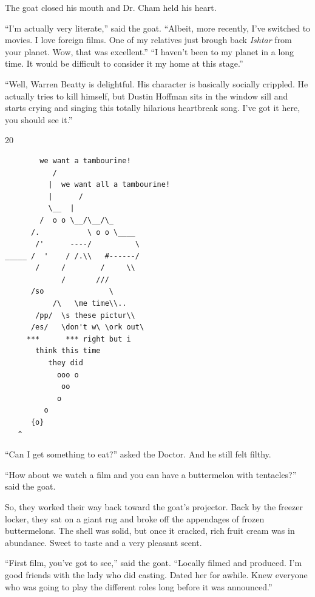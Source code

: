 \documentclass[10pt,twoside]{report}
\begin{document}
The goat closed his mouth and Dr. Cham held his heart.

``I'm actually very literate,'' said the goat.  ``Albeit, more
recently, I've switched to movies.  I love foreign films.  One of my
relatives just brough back {\em Ishtar} from your planet.  Wow, that
was excellent.''  ``I haven't been to my planet in a long time.  It
would be difficult to consider it my home at this stage.''

``Well, Warren Beatty is delightful.  His character is basically
socially crippled.  He actually tries to kill himself, but Dustin
Hoffman sits in the window sill and starts crying and singing this
totally hilarious heartbreak song.  I've got it here, you should see
it.''

	\begin{sidebar}{}{20}
\begin{verbatim}
		we want a tambourine!
           /
          |  we want all a tambourine!
          |      /
          \__  |
        /  o o \__/\__/\_
      /.           \ o o \____
       /'      ----/          \
_____ /  '    / /.\\   #------/
       /     /        /     \\
             /       ///
      /so               \
           /\   \me time\\..
       /pp/  \s these pictur\\
      /es/   \don't w\ \ork out\
     ***      *** right but i
       think this time
          they did
            ooo o
             oo
            o
         o
      {o}
   ^
\end{verbatim}
	\end{sidebar}

``Can I get something to eat?'' asked the Doctor.  And he still felt
filthy.

``How about we watch a film and you can have a buttermelon with
tentacles?'' said the goat.

So, they worked their way back toward the goat's projector.  Back by
the freezer locker, they sat on a giant rug and broke off the
appendages of frozen buttermelons.  The shell was solid, but once it
cracked, rich fruit cream was in abundance.  Sweet to taste and a very
pleasant scent.

``First film, you've got to see,'' said the goat.  ``Locally filmed
and produced.  I'm good friends with the lady who did casting.  Dated
her for awhile.  Knew everyone who was going to play the different
roles long before it was announced.''
\end{document}
